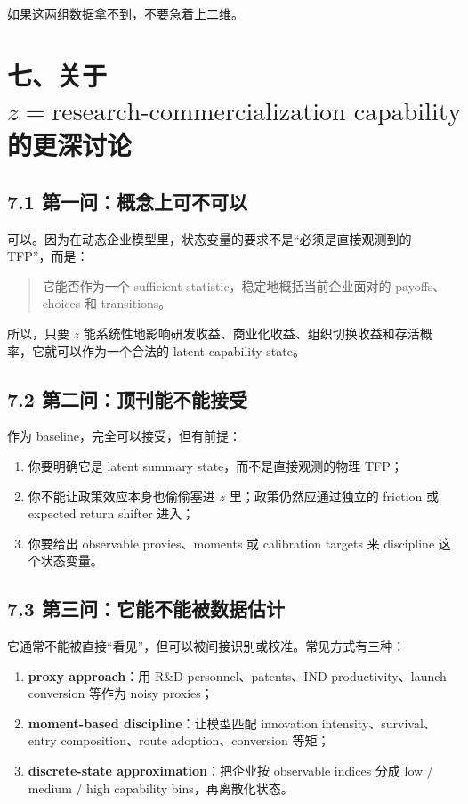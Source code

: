 \documentclass[12pt]{ctexart}
\begin{document}
如果这两组数据拿不到，不要急着上二维。

\section{七、关于 \texorpdfstring{$z=\text{research-commercialization capability}$}{z = research-commercialization capability} 的更深讨论}

\subsection{7.1 第一问：概念上可不可以}

可以。因为在动态企业模型里，状态变量的要求不是“必须是直接观测到的 TFP”，而是：

\begin{quote}
它能否作为一个 sufficient statistic，稳定地概括当前企业面对的 payoffs、choices 和 transitions。
\end{quote}

所以，只要 \(z\) 能系统性地影响研发收益、商业化收益、组织切换收益和存活概率，它就可以作为一个合法的 latent capability state。

\subsection{7.2 第二问：顶刊能不能接受}

作为 baseline，完全可以接受，但有前提：

\begin{enumerate}[leftmargin=2em]
    \item 你要明确它是 latent summary state，而不是直接观测的物理 TFP；
    \item 你不能让政策效应本身也偷偷塞进 \(z\) 里；政策仍然应通过独立的 friction 或 expected return shifter 进入；
    \item 你要给出 observable proxies、moments 或 calibration targets 来 discipline 这个状态变量。
\end{enumerate}

\subsection{7.3 第三问：它能不能被数据估计}

它通常不能被直接“看见”，但可以被间接识别或校准。常见方式有三种：

\begin{enumerate}[leftmargin=2em]
    \item \textbf{proxy approach}：用 R\&D personnel、patents、IND productivity、launch conversion 等作为 noisy proxies；
    \item \textbf{moment-based discipline}：让模型匹配 innovation intensity、survival、entry composition、route adoption、conversion 等矩；
    \item \textbf{discrete-state approximation}：把企业按 observable indices 分成 low / medium / high capability bins，再离散化状态。
\end{enumerate}
\end{document}
